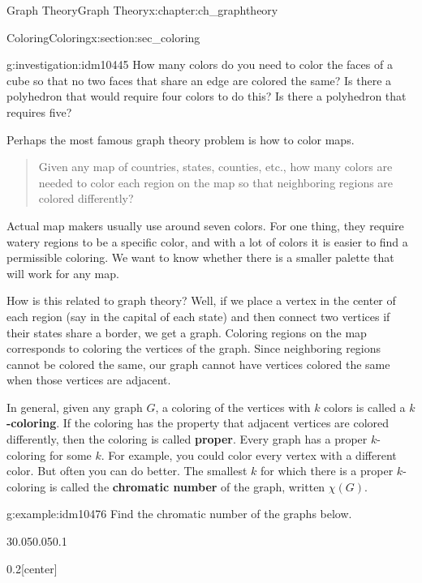 \documentclass[oneside,10pt,]{book}
\newcommand{\terminology}[1]{\textbf{#1}}
\numberwithin{equation}{chapter}
\newcommand{\vtx}[2]{node[fill,circle,inner sep=0pt, minimum size=4pt,label=#1:#2]{}}
\renewcommand{\v}{\vtx{above}{}}
\begin{document}
\begin{chapterptx}{Graph Theory}{}{Graph Theory}{}{}{x:chapter:ch_graphtheory}
\begin{sectionptx}{Coloring}{}{Coloring}{}{}{x:section:sec_coloring}
\begin{introduction}{}
\begin{investigation}{}{g:investigation:idm10445}
How many colors do you need to color the faces of a cube so that no two faces that share an edge are colored the same?  Is there a polyhedron that would require four colors to do this?  Is there a polyhedron that requires five?%
\end{investigation}
Perhaps the most famous graph theory problem is how to color maps.%
\begin{quote}%
Given any map of countries, states, counties, etc., how many colors are needed to color each region on the map so that neighboring regions are colored differently?%
\end{quote}
Actual map makers usually use around seven colors. For one thing, they require watery regions to be a specific color, and with a lot of colors it is easier to find a permissible coloring. We want to know whether there is a smaller palette that will work for any map.%
\par
How is this related to graph theory? Well, if we place a vertex in the center of each region (say in the capital of each state) and then connect two vertices if their states share a border, we get a graph. Coloring regions on the map corresponds to coloring the vertices of the graph. Since neighboring regions cannot be colored the same, our graph cannot have vertices colored the same when those vertices are adjacent.%
\par
In general, given any graph \(G\), a coloring of the vertices with \(k\) colors is called a \terminology{\(k\)-coloring}. If the coloring has the property that adjacent vertices are colored differently, then the coloring is called \terminology{proper}. Every graph has a proper \(k\)-coloring for some \(k\). For example, you could color every vertex with a different color. But often you can do better. The smallest \(k\) for which there is a proper \(k\)-coloring is called the \terminology{chromatic number} of the graph, written \(\chi(G)\)\label{g:notation:idm10472}.%
\begin{example}{}{g:example:idm10476}%
Find the chromatic number of the graphs below.%
\begin{sidebyside}{3}{0.05}{0.05}{0.1}%
\begin{sbspanel}{0.2}[center]%
\resizebox{\linewidth}{!}{%
\begin{tikzpicture}
	      \foreach \x in {0,...,6}
	      \draw  (\x*60:1) \v -- (\x*60+60:1) -- (\x*60+180:1) -- cycle;
	    \end{tikzpicture}
}%
\end{sbspanel}%

\end{sidebyside}
\end{example}
\end{introduction}
\end{sectionptx}
\end{chapterptx}
\end{document}
